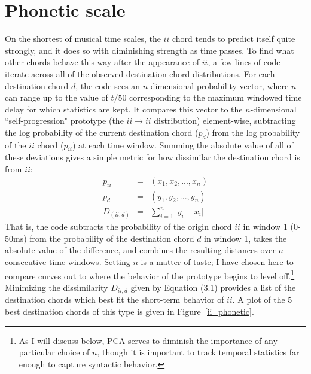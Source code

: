 \section{Phonetic scale}
On the shortest of musical time scales, the $ii$ chord tends to predict itself quite strongly, and it does so with diminishing strength as time passes.  To find what other chords behave this way after the appearance of $ii$, a few lines of code iterate across all of the observed destination chord distributions.  For each destination chord $d$, the code sees an $n$-dimensional probability vector, where $n$ can range up to the value of $t/50$ corresponding to the maximum windowed time delay for which statistics are kept.  It compares this vector to the $n$-dimensional ``self-progression" prototype (the $ii \rightarrow ii$ distribution) element-wise, subtracting the log probability of the current destination chord ($p_d$) from the log probability of the $ii$ chord ($p_{ii}$) at each time window.  Summing the absolute value of all of these deviations gives a simple metric for how dissimilar the destination chord is from $ii$:
\begin{eqnarray}
p_{ii} &=& (x_1, x_2, ... ,  x_n) \nonumber \\
p_{d} &=& (y_1, y_2, ..., y_n) \nonumber \\
D_{(ii,d)} &=& \sum_{i=1}^{n} \lvert y_i - x_i \rvert
\end{eqnarray}
That is, the code subtracts the probability of the origin chord $ii$ in window 1 (0-50ms) from the probability of the destination chord $d$ in window 1, takes the absolute value of the difference, and combines the resulting distances over $n$ consecutive time windows.  Setting $n$ is a matter of taste; I have chosen here to compare curves out to where the behavior of the prototype begins to level off.\footnote{As I will discuss below, PCA serves to diminish the importance of any particular choice of $n$, though it is important to track temporal statistics far enough to capture syntactic behavior.}  Minimizing the dissimilarity $D_{ii,d}$ given by Equation (3.1) provides a list of the destination chords which best fit the short-term behavior of $ii$.  A plot of the 5 best destination chords of this type is given in Figure~\ref{ii_phonetic}.

